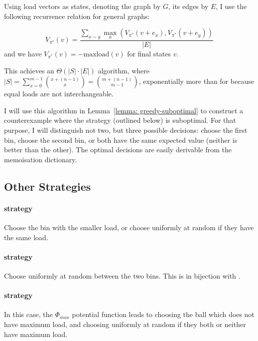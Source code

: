 Using load vectors as states, denoting the graph by $G$, its edges by $E$, I use the following recurrence relation for general graphs:


\begin{equation} \label{eq:graphicaltwochoice-dynamicprogramming}
    V_{\pi^*}(v) = \frac{\sum_{x\sim y}\max_a (V_{\pi^*}(v+e_x), V_{\pi^*}(v+e_y))}{|E|}
\end{equation}
and we have $V_{\pi^*}(v)=-\mathrm{maxload}(v)$ for final states $v$.

This achieves an $\Theta(|S|\cdot |E|)$ algorithm, where $|S| = \sum_{x=0}^{m-1} {{x+(n-1)} \choose {x}} = {{m+(n-1)} \choose {m-1}}$, exponentially more than for \TwoThinning because equal loads are not interchangeable.

I will use this algorithm in Lemma~\ref{lemma: greedy-suboptimal} to construct a counterexample where the \Greedy strategy (outlined below) is suboptimal. For that purpose, I will distinguish not two, but three possible decisions: choose the first bin, choose the second bin, or both have the same expected value (neither is better than the other). The optimal decisions are easily derivable from the memoisation dictionary.


\subsection{Other Strategies} \label{graphical-otherstrategies}


\paragraph{\Greedy strategy} Choose the bin with the smaller load, or choose uniformly at random if they have the same load.


\paragraph{\Random strategy} Choose uniformly at random between the two bins. This is in bijection with \OneChoice.


\paragraph{\LocalRewardOptimiser strategy} In this case, the $\Phi_{max}$ potential function leads to choosing the ball which does not have maximum load, and choosing uniformly at random if they both or neither have maximum load.


